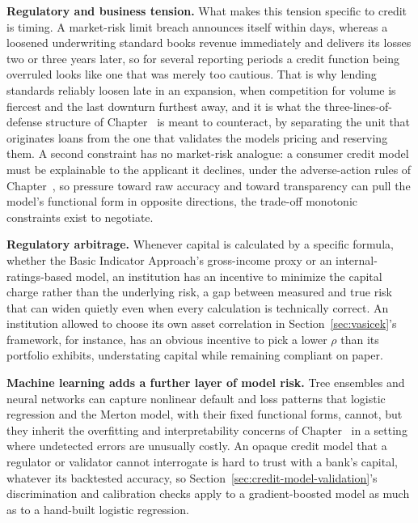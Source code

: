 \documentclass[../ai_in_finance]{subfiles}
\begin{document}
\textbf{Regulatory and business tension.} What makes this tension specific to credit is timing. A market-risk limit breach announces itself within days, whereas a loosened underwriting standard books revenue immediately and delivers its losses two or three years later, so for several reporting periods a credit function being overruled looks like one that was merely too cautious. That is why lending standards reliably loosen late in an expansion, when competition for volume is fiercest and the last downturn furthest away, and it is what the three-lines-of-defense structure of Chapter~ is meant to counteract, by separating the unit that originates loans from the one that validates the models pricing and reserving them.
A second constraint has no market-risk analogue: a consumer credit model must be explainable to the applicant it declines, under the adverse-action rules of Chapter~, so pressure toward raw accuracy and toward transparency can pull the model's functional form in opposite directions, the trade-off monotonic constraints exist to negotiate.

\textbf{Regulatory arbitrage.} Whenever capital is calculated by a specific formula, whether the Basic Indicator Approach's gross-income proxy or an internal-ratings-based model, an institution has an incentive to minimize the capital charge rather than the underlying risk, a gap between measured and true risk that can widen quietly even when every calculation is technically correct.
An institution allowed to choose its own asset correlation in Section~\ref{sec:vasicek}'s framework, for instance, has an obvious incentive to pick a lower $\rho$ than its portfolio exhibits, understating capital while remaining compliant on paper.

\textbf{Machine learning adds a further layer of model risk.} Tree ensembles and neural networks can capture nonlinear default and loss patterns that logistic regression and the Merton model, with their fixed functional forms, cannot, but they inherit the overfitting and interpretability concerns of Chapter~ in a setting where undetected errors are unusually costly.
An opaque credit model that a regulator or validator cannot interrogate is hard to trust with a bank's capital, whatever its backtested accuracy, so Section~\ref{sec:credit-model-validation}'s discrimination and calibration checks apply to a gradient-boosted model as much as to a hand-built logistic regression.

\end{document}
